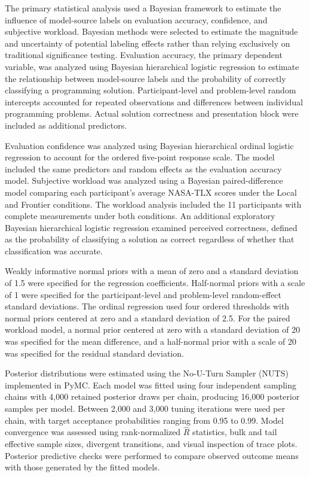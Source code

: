 \documentclass[manuscript,review]{acmart}
\begin{document}
The primary statistical analysis used a Bayesian framework to estimate the influence of model-source labels on evaluation accuracy, confidence, and subjective workload. Bayesian methods were selected to estimate the magnitude and uncertainty of potential labeling effects rather than relying exclusively on traditional significance testing. Evaluation accuracy, the primary dependent variable, was analyzed using Bayesian hierarchical logistic regression to estimate the relationship between model-source labels and the probability of correctly classifying a programming solution. Participant-level and problem-level random intercepts accounted for repeated observations and differences between individual programming problems. Actual solution correctness and presentation block were included as additional predictors.

Evaluation confidence was analyzed using Bayesian hierarchical ordinal logistic regression to account for the ordered five-point response scale. The model included the same predictors and random effects as the evaluation accuracy model. Subjective workload was analyzed using a Bayesian paired-difference model comparing each participant's average NASA-TLX scores under the Local and Frontier conditions. The workload analysis included the 11 participants with complete measurements under both conditions. An additional exploratory Bayesian hierarchical logistic regression examined perceived correctness, defined as the probability of classifying a solution as correct regardless of whether that classification was accurate.

Weakly informative normal priors with a mean of zero and a standard deviation of 1.5 were specified for the regression coefficients. Half-normal priors with a scale of 1 were specified for the participant-level and problem-level random-effect standard deviations. The ordinal regression used four ordered thresholds with normal priors centered at zero and a standard deviation of 2.5. For the paired workload model, a normal prior centered at zero with a standard deviation of 20 was specified for the mean difference, and a half-normal prior with a scale of 20 was specified for the residual standard deviation.

Posterior distributions were estimated using the No-U-Turn Sampler (NUTS) implemented in PyMC. Each model was fitted using four independent sampling chains with 4,000 retained posterior draws per chain, producing 16,000 posterior samples per model. Between 2,000 and 3,000 tuning iterations were used per chain, with target acceptance probabilities ranging from 0.95 to 0.99. Model convergence was assessed using rank-normalized $\hat{R}$ statistics, bulk and tail effective sample sizes, divergent transitions, and visual inspection of trace plots. Posterior predictive checks were performed to compare observed outcome means with those generated by the fitted models.
\end{document}
